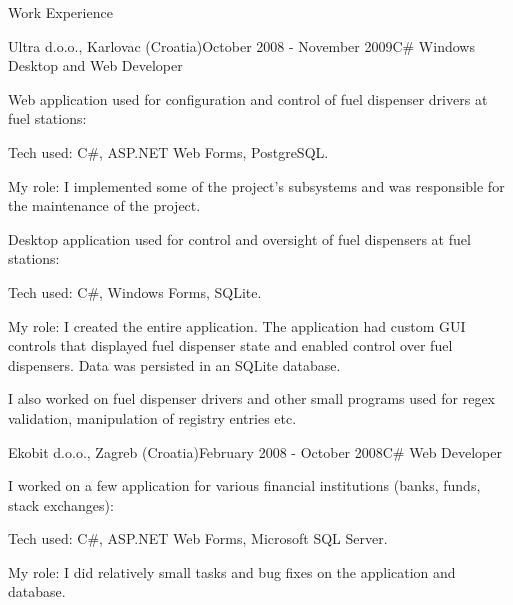 \documentclass{resume}
\begin{document}
\begin{rSection}{Work Experience}
\begin{rSubsection}{Ultra d.o.o., Karlovac (Croatia)}{October 2008 - November 2009}{C\# Windows Desktop and Web Developer}{}

Web application used for configuration and control of fuel dispenser drivers at fuel stations:

\begin{rList}
\item Tech used: C\#, ASP.NET Web Forms, PostgreSQL.
\item My role: I implemented some of the project's subsystems and was responsible for the maintenance of the project.
\end{rList}

Desktop application used for control and oversight of fuel dispensers at fuel stations:

\begin{rList}
\item Tech used: C\#, Windows Forms, SQLite.
\item My role: I created the entire application. The application had custom GUI controls that displayed fuel dispenser state and enabled control over fuel dispensers. Data was persisted in an SQLite database.
\end{rList}

I also worked on fuel dispenser drivers and other small programs used for regex validation, manipulation of registry entries etc.

\end{rSubsection}

\vspace{2.0em}

\begin{rSubsection}{Ekobit d.o.o., Zagreb (Croatia)}{February 2008 - October 2008}{C\# Web Developer}{}

I worked on a few application for various financial institutions (banks, funds, stack exchanges):

\begin{rList}
\item Tech used: C\#, ASP.NET Web Forms, Microsoft SQL Server.
\item My role: I did relatively small tasks and bug fixes on the application and database.
\end{rList}

\end{rSubsection}

\vspace{2.0em}


\end{rSection}
\end{document}
